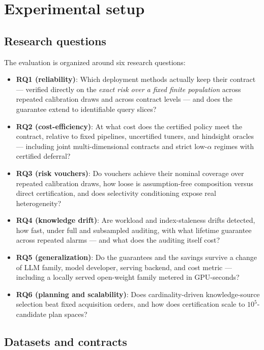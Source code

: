 \section{Experimental setup}
\label{sec:setup}

\subsection{Research questions}
\label{sec:rqs}

The evaluation is organized around six research questions:
\begin{itemize}
\item \textbf{RQ1 (reliability)}: Which deployment methods actually
keep their contract --- verified directly on the \emph{exact risk over
a fixed finite population} across repeated calibration draws and
across contract levels --- and does the guarantee extend to
identifiable query slices?
\item \textbf{RQ2 (cost-efficiency)}: At what cost does the certified
policy meet the contract, relative to fixed pipelines, uncertified
tuners, and hindsight oracles --- including joint multi-dimensional
contracts and strict low-$\alpha$ regimes with certified deferral?
\item \textbf{RQ3 (risk vouchers)}: Do vouchers achieve their nominal
coverage over repeated calibration draws, how loose is assumption-free
composition versus direct certification, and does selectivity
conditioning expose real heterogeneity?
\item \textbf{RQ4 (knowledge drift)}: Are workload and index-staleness
drifts detected, how fast, under full and subsampled auditing, with
what lifetime guarantee across repeated alarms --- and what does the
auditing itself cost?
\item \textbf{RQ5 (generalization)}: Do the guarantees and the savings
survive a change of LLM family, model developer, serving backend, and
cost metric --- including a locally served open-weight family metered
in GPU-seconds?
\item \textbf{RQ6 (planning and scalability)}: Does cardinality-driven
knowledge-source selection beat fixed acquisition orders, and how does
certification scale to $10^5$-candidate plan spaces?
\end{itemize}

\subsection{Datasets and contracts}
\label{sec:datasets}

